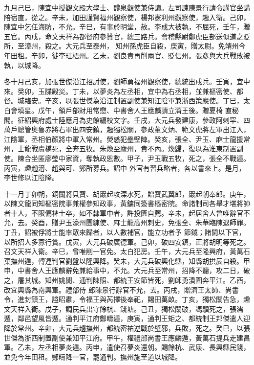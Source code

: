 \begin{pinyinscope}
 九月己巳，陳宜中授觀文殿大學士、醴泉觀使兼侍讀。左司諫陳景行請令講官坐講陪宿直，從之。辛未，加田謹賢福州觀察使，楊邦憲利州觀察使，趣入衛。己卯，陳宜中乞任海防，不允。辛巳，有事於明堂，赦。李成大被執，不屈死，壬午，贈五官。丙戌，命文天祥為都督府參贊官，總三路兵。會稽縣尉鄭虎臣部送似道之貶所，至漳州，殺之。大元兵至泰州，
 知州孫虎臣自殺，庚寅，贈太尉。免靖州今年田租。辛卯，徙李玨梧州。乙未，劉良貴再削兩官、貶信州。張彥與大兵戰敗被執，以城降。



 冬十月己亥，加張世傑沿江招討使，劉師勇福州觀察使，總統出戍兵。壬寅，宜中來。癸卯，玉牒殿災。丁未，以夢炎為左丞相，宜中為右丞相，並兼樞密使、都督。城臨安。辛亥，以張世傑為沿江制置副使兼知江陰軍兼浙西策應使。丁巳，太白會填星。戊午，領戶部財用常懋、中書舍人王應麟請立濟王後。贈夏椅
 直秘閣。征紹興府處士陸應月為史館編校文字。壬戌，大元兵發建康，參政阿刺罕、四萬戶總管奧魯赤將右軍出四安鎮，趣獨松關，參政董文炳、範文虎將左軍出江入，江陰軍，丞相伯顏將中軍入常州。熒惑犯壘壁陣。癸亥，張全、尹玉、麻士龍援常州，士龍戰虞橋死，全奔五牧。朱煥至廬州，貴不內。煥歸，復以為淮東制置副使。陳合坐匿廖瑩中家資，奪執政恩數。甲子，尹玉戰五牧，死之，張全不戰遁。丙寅，趣趙溍、趙與可、鄭所募兵。詔中
 外官有習兵略者，各以書來上。是月，李世修以江陰降。



 十一月丁卯朔，銅關將貝寶、胡巖起攻溧水死，贈寶武翼郎，巖起朝奉郎。庚午，以陳文龍同知樞密院事兼權參知政事，黃鏞同簽書樞密院。命諸制司各舉才堪將帥者十人，不限偏裨士卒，如不隸軍中者，許投匱自薦。辛未，起居舍人曾唯辭官不允，去。癸酉，贈尹玉濠州團練使、麻士龍高州刺史，免張全、朱華臨陳退師罪。丁丑，詔被俘將士能率眾來歸者，以人數補官，能立功者予
 節鉞；諸閫以下官，以所招人多寡行賞。戊寅，大元兵破廣德軍。己卯，破四安鎮，正將胡明等死之。召文天祥入衛。辛巳，曾唯削一官免。太白犯房。壬午，大元兵至隆興府，黃萬石棄撫州遁，轉運判官劉盤以隆興降。癸未，大元兵破興化縣，知縣胡拱辰自殺。甲申，中書舍人王應麟辭免兼給事中，不允。大元兵至常州，招降不聽，攻二日，破之，屠其城。知州姚誾、通判陳照、都統王安節皆死，劉師勇潰圍奔平江。乙酉，改宜興縣為南興軍。禮部侍
 郎陳景行辭官不允，去。丙戌，贈濟王太師、尚書令，進封鎮王，謚昭肅，令福王與芮擇後奉祀，賜田萬畝。丁亥，獨松關告急，趣文天祥入衛。戊子，調民兵出守餘杭、錢塘。己丑，獨松關破，馮驥死之，張濡遁，鄰邑望風皆遁。通判平江府鄭疇遁，庚寅，通判王矩之、都統制王邦傑遣人迎降於常州。辛卯，大元兵趨撫州，都統密祐逆戰於璧邪，兵敗，死之。癸巳，以張世傑為浙西制置副使兼知平江府。甲午，權禮部尚書王應麟遁，黃萬石提兵走建昌
 軍。乙未，左丞相夢炎遁。丙申，遣使召夢炎還朝。賜餘杭、武康、長興縣民錢，並免今年田租。鄭疇降一官，罷通判。撫州施至道以城降。




\end{pinyinscope}

